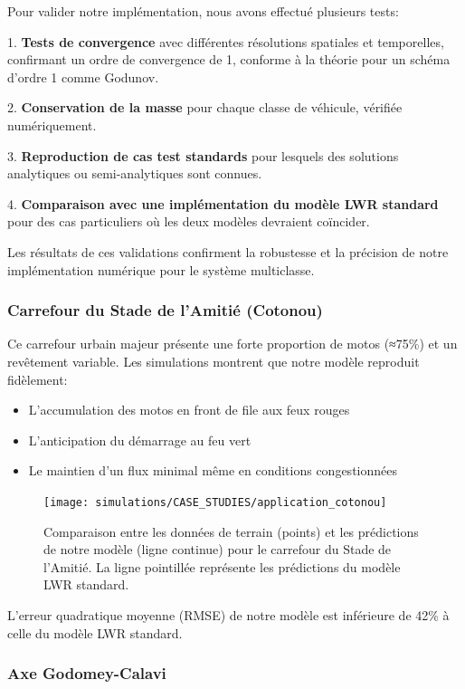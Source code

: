 Pour valider notre implémentation, nous avons effectué plusieurs tests:

1. \textbf{Tests de convergence} avec différentes résolutions spatiales et temporelles, confirmant un ordre de convergence de 1, conforme à la théorie pour un schéma d'ordre 1 comme Godunov.

2. \textbf{Conservation de la masse} pour chaque classe de véhicule, vérifiée numériquement.

3. \textbf{Reproduction de cas test standards} pour lesquels des solutions analytiques ou semi-analytiques sont connues.

4. \textbf{Comparaison avec une implémentation du modèle LWR standard} pour des cas particuliers où les deux modèles devraient coïncider.

Les résultats de ces validations confirment la robustesse et la précision de notre implémentation numérique pour le système multiclasse.

\subsubsection{Carrefour du Stade de l'Amitié (Cotonou)}
\label{subsubsec:carrefour_stade}

Ce carrefour urbain majeur présente une forte proportion de motos (≈75\%) et un revêtement variable. Les simulations montrent que notre modèle reproduit fidèlement:
\begin{itemize}
\item L'accumulation des motos en front de file aux feux rouges
\item L'anticipation du démarrage au feu vert
\item Le maintien d'un flux minimal même en conditions congestionnées
\end{itemize}

\begin{figure}[htbp]
\centering
\texttt{[image: simulations/CASE\_STUDIES/application\_cotonou]}
\caption{Comparaison entre les données de terrain (points) et les prédictions de notre modèle (ligne continue) pour le carrefour du Stade de l'Amitié. La ligne pointillée représente les prédictions du modèle LWR standard.}
\label{fig:application_cotonou}
\end{figure}

L'erreur quadratique moyenne (RMSE) de notre modèle est inférieure de 42\% à celle du modèle LWR standard.

\subsubsection{Axe Godomey-Calavi}
\label{subsubsec:axe_godomey}

